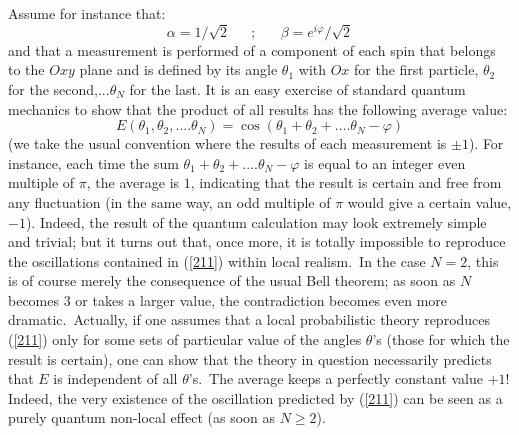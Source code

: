 \documentclass[12pt,onecolumn]{article}%
\begin{document}
Assume for instance that:%
\begin{equation}
\alpha=1/\sqrt{2}\,\,\,\,\,\,\,\,\,;\,\,\,\,\,\,\,\,\,\,\beta=e^{i\varphi
}/\sqrt{2} \label{21bis}%
\end{equation}
and that a measurement is performed of a component of each spin that belongs
to the $Oxy$ plane and is defined by its angle $\theta_{1}$ with $Ox$ for the
first particle, $\theta_{2}$ for the second,...$\theta_{N}$ for the last. It
is an easy exercise of standard quantum mechanics to show that the product of
all results has the following average value:
\begin{equation}
E(\theta_{1},\theta_{2},....\theta_{N})=\cos(\theta_{1}+\theta_{2}%
+....\theta_{N}-\varphi) \label{211}%
\end{equation}
(we take the usual convention where the results of each measurement is $\pm
1$). For instance, each time the sum $\theta_{1}+\theta_{2}+....\theta
_{N}-\varphi$ is equal to an integer even multiple of $\pi$, the average is
$1$, indicating that the result is certain and free from any fluctuation (in
the same way, an odd multiple of $\pi$ would give a certain value, $-1$).
Indeed, the result of the quantum calculation may look extremely simple and
trivial; but it turns out that, once more, it is totally impossible to
reproduce the oscillations contained in (\ref{211}) within local realism.\ In
the case $N=2$, this is of course merely the consequence of the usual Bell
theorem; as soon as $N$ becomes $3$ or takes a larger value, the contradiction
becomes even more dramatic.\ Actually, if one assumes that a local
probabilistic theory reproduces (\ref{211}) only for some sets of particular
value of the angles $\theta$'s (those for which the result is certain), one
can show \cite{FL2} that the theory in question necessarily predicts that $E$
is independent of all $\theta$'s.\ The average keeps a perfectly constant
value $+1$! Indeed, the very existence of the oscillation predicted by
(\ref{211}) can be seen as a purely quantum non-local effect (as soon as
$N\geq2$).
\end{document}
